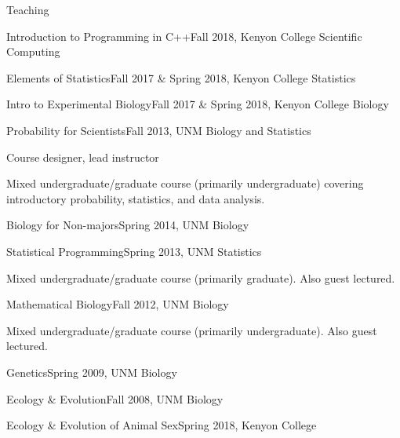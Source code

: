 \documentclass{resume} %
\begin{document}
\begin{rSection}{Teaching}
\begin{rSubsection}{Introduction to Programming in C++}{Fall 2018, Kenyon College Scientific Computing}{}{}
\nullitem
\end{rSubsection}
\begin{rSubsection}{Elements of Statistics}{Fall 2017 \& Spring 2018, Kenyon College Statistics}{}{}
\nullitem
\end{rSubsection}
\begin{rSubsection}{Intro to Experimental Biology}{Fall 2017 \& Spring 2018, Kenyon College Biology}{}{}
\nullitem
\end{rSubsection}
\begin{rSubsection}{Probability for Scientists}{Fall 2013, UNM Biology and Statistics}{}{}
\item Course designer, lead instructor
\item Mixed undergraduate/graduate course (primarily undergraduate) covering
introductory probability, statistics, and data analysis.
\end{rSubsection}
\begin{rSubsection}{Biology for Non-majors}{Spring 2014, UNM Biology}{}{}
\nullitem
\end{rSubsection}
\begin{rSubsection}{Statistical Programming}{Spring 2013, UNM Statistics}{}{}
\item Mixed undergraduate/graduate course (primarily graduate). Also guest
lectured.
\end{rSubsection}
\begin{rSubsection}{Mathematical Biology}{Fall 2012, UNM Biology}{}{}
\item Mixed undergraduate/graduate course (primarily undergraduate). Also guest lectured.
\end{rSubsection}
\begin{rSubsection}{Genetics}{Spring 2009, UNM Biology}{}{}
\nullitem
\end{rSubsection}
\begin{rSubsection}{Ecology \& Evolution}{Fall 2008, UNM Biology}{}{}
\nullitem
\end{rSubsection}
\begin{rSubsection}{Ecology \& Evolution of Animal Sex}{Spring 2018, Kenyon College}{}{}

\end{rSubsection}
\end{rSection}
\end{document}
